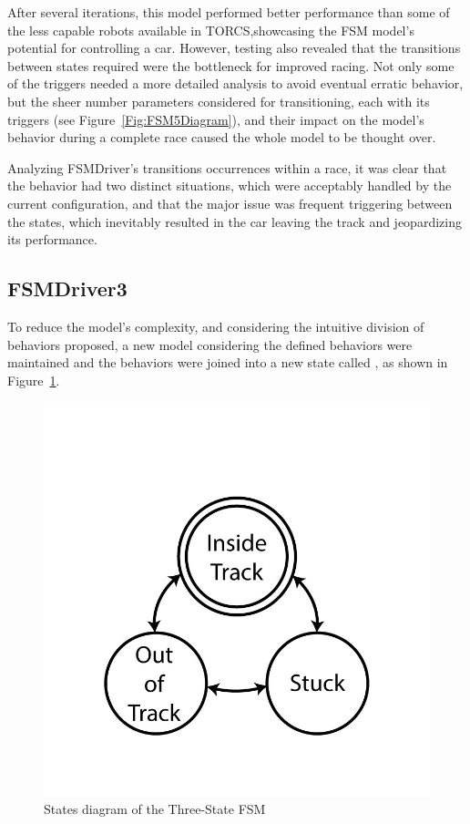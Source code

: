 After several iterations, this model performed better performance than some of the less capable robots available in TORCS,showcasing the FSM model's potential for controlling a car. However, testing also revealed that the transitions between states required were the bottleneck for improved racing. Not only some of the triggers needed a more detailed analysis to avoid eventual erratic behavior, but the sheer number parameters considered for transitioning, each with its triggers (see Figure~\ref{Fig:FSM5Diagram}), and their impact on the model's behavior during a complete race caused the whole model to be thought over.

Analyzing FSMDriver's transitions occurrences within a race, it was clear that the  behavior had two distinct situations, which were acceptably handled by the current configuration, and that the major issue was frequent triggering between the  states, which inevitably resulted in the car leaving the track and jeopardizing its performance.

\subsection{FSMDriver3}%
To reduce the model's complexity, and considering the intuitive division of behaviors proposed, a new model considering the defined  behaviors were maintained and the  behaviors were joined into a new state called \IT, as shown in Figure~\ref{Fig:FSM3Diagram}.

\begin{figure}[h]
	\centering
	\includegraphics[width=.45\textwidth]{ThreeStateFSM}
	\caption{States diagram of the Three-State FSM}
	\label{Fig:FSM3Diagram}
\end{figure}



